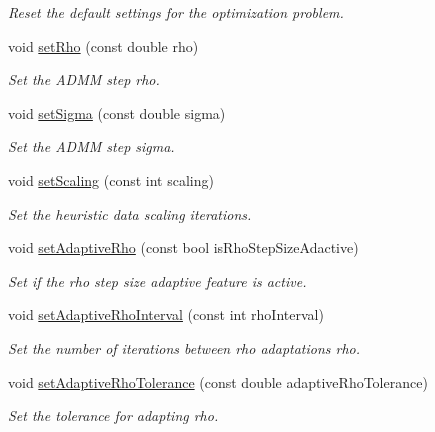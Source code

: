 \begin{DoxyCompactItemize}
\begin{DoxyCompactList}\small\item\em Reset the default settings for the optimization problem. \end{DoxyCompactList}\item 
void \hyperlink{classOsqpEigen_1_1Settings_a7412ba8eb706c52d80673628c54d2a40}{set\+Rho} (const double rho)
\begin{DoxyCompactList}\small\item\em Set the A\+D\+MM step rho. \end{DoxyCompactList}\item 
void \hyperlink{classOsqpEigen_1_1Settings_a59dc6a98b52eece19846a77a00036b5a}{set\+Sigma} (const double sigma)
\begin{DoxyCompactList}\small\item\em Set the A\+D\+MM step sigma. \end{DoxyCompactList}\item 
void \hyperlink{classOsqpEigen_1_1Settings_a879a1fec8d21859d4cdcaafdb6df4554}{set\+Scaling} (const int scaling)
\begin{DoxyCompactList}\small\item\em Set the heuristic data scaling iterations. \end{DoxyCompactList}\item 
void \hyperlink{classOsqpEigen_1_1Settings_a9aa2c776ed96d6cc02fbbf29e3d70f2f}{set\+Adaptive\+Rho} (const bool is\+Rho\+Step\+Size\+Adactive)
\begin{DoxyCompactList}\small\item\em Set if the rho step size adaptive feature is active. \end{DoxyCompactList}\item 
void \hyperlink{classOsqpEigen_1_1Settings_a499bb35ff72b900bf0063f7f8be679de}{set\+Adaptive\+Rho\+Interval} (const int rho\+Interval)
\begin{DoxyCompactList}\small\item\em Set the number of iterations between rho adaptations rho. \end{DoxyCompactList}\item 
void \hyperlink{classOsqpEigen_1_1Settings_afb3740497a1c9ecef66bc1c142169604}{set\+Adaptive\+Rho\+Tolerance} (const double adaptive\+Rho\+Tolerance)
\begin{DoxyCompactList}\small\item\em Set the tolerance for adapting rho. \end{DoxyCompactList}\item 

\end{DoxyCompactItemize}

